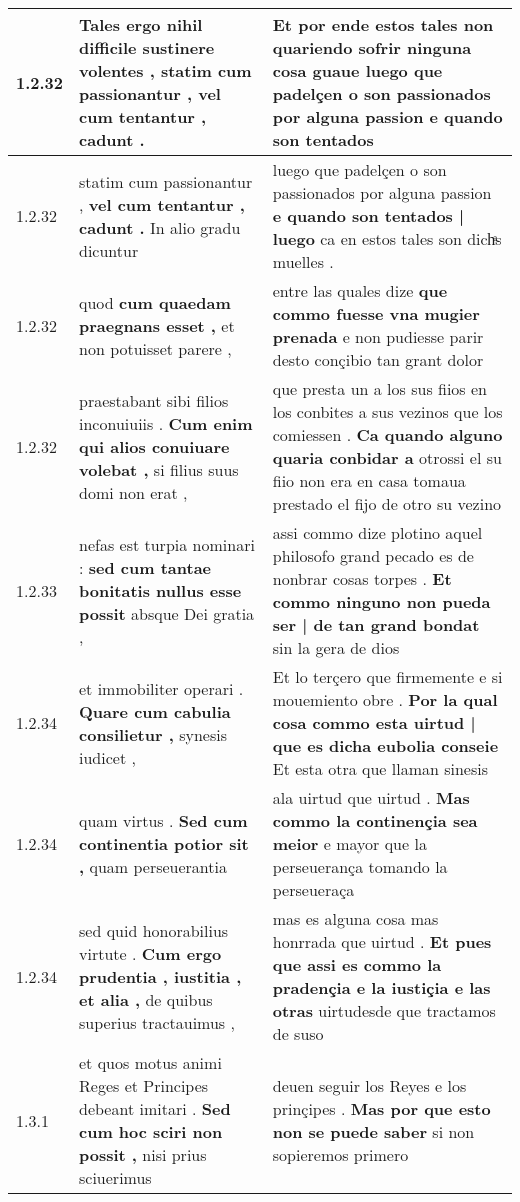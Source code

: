 \begin{tabular}{|p{1cm}|p{6.5cm}|p{6.5cm}|}
1.2.32 & Tales ergo nihil difficile sustinere volentes , \textbf{ statim cum passionantur , } vel cum tentantur , cadunt . & Et por ende estos tales non quariendo sofrir ninguna cosa guaue \textbf{ luego que padelçen o son passionados por alguna passion } e quando son tentados \\\hline
1.2.32 & statim cum passionantur , \textbf{ vel cum tentantur , cadunt . } In alio gradu dicuntur & luego que padelçen o son passionados por alguna passion \textbf{ e quando son tentados | luego } ca en estos tales son dichͣs muelles . \\\hline
1.2.32 & quod \textbf{ cum quaedam praegnans esset , } et non potuisset parere , & entre las quales dize \textbf{ que commo fuesse vna mugier prenada } e non pudiesse parir desto conçibio tan grant dolor \\\hline
1.2.32 & praestabant sibi filios inconuiuiis . \textbf{ Cum enim qui alios conuiuare volebat , } si filius suus domi non erat , & que presta un a los sus fiios en los conbites a sus vezinos que los comiessen . \textbf{ Ca quando alguno quaria conbidar a } otrossi el su fiio non era en casa tomaua prestado el fijo de otro su vezino \\\hline
1.2.33 & nefas est turpia nominari : \textbf{ sed cum tantae bonitatis nullus esse possit } absque Dei gratia , & assi commo dize plotino aquel philosofo grand pecado es de nonbrar cosas torpes . \textbf{ Et commo ninguno non pueda ser | de tan grand bondat } sin la gera de dios \\\hline
1.2.34 & et immobiliter operari . \textbf{ Quare cum cabulia consilietur , } synesis iudicet , & Et lo terçero que firmemente e si mouemiento obre . \textbf{ Por la qual cosa commo esta uirtud | que es dicha eubolia conseie } Et esta otra que llaman sinesis \\\hline
1.2.34 & quam virtus . \textbf{ Sed cum continentia potior sit , } quam perseuerantia & ala uirtud que uirtud . \textbf{ Mas commo la continençia sea meior } e mayor que la perseuerança tomando la perseueraça \\\hline
1.2.34 & sed quid honorabilius virtute . \textbf{ Cum ergo prudentia , iustitia , et alia , } de quibus superius tractauimus , & mas es alguna cosa mas honrrada que uirtud . \textbf{ Et pues que assi es commo la pradençia e la iustiçia e las otras } uirtudesde que tractamos de suso \\\hline
1.3.1 & et quos motus animi Reges et Principes debeant imitari . \textbf{ Sed cum hoc sciri non possit , } nisi prius sciuerimus & deuen seguir los Reyes e los prinçipes . \textbf{ Mas por que esto non se puede saber } si non sopieremos primero \\\hline

\end{tabular}
